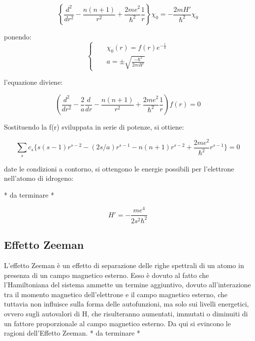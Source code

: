 \documentclass{report}
\begin{document}
\begin{equation}
  \left\{\frac{d^2}{dr^2} -\frac{n(n+1)}{r^2} +\frac{2me^2}{\hbar^2}\frac{1}{r} \right\}\chi_0= -\frac{2mH'}{\hbar^2}\chi_0
\end{equation}

ponendo:
\begin{equation}
  \left\{
  \begin{aligned}
     &  & \chi_0(r)=f(r)e^{-\frac{r}{a}}     \\
     &  & a=\pm \sqrt{\frac{-\hbar^2}{2mH'}}
  \end{aligned}
  \right.
\end{equation}

l'equazione diviene:

\begin{equation}
  \left(\frac{d^2}{dr^2} -\frac{2}{a}\frac{d}{dr} -\frac{n(n+1)}{r^2} +\frac{2me^2}{\hbar^2}\frac{1}{r}\right)f(r)=0
\end{equation}

Sostituendo la f(r) sviluppata in serie di potenze, si ottiene:

\begin{equation}
  \sum_{s} c_s \{s(s-1)r^{s-2}-(2s/a)r^{s-1}-n(n+1)r^{s-2}+\frac{2me^2}{\hbar^2}r^{s-1} \}=0
\end{equation}

date le condizioni a contorno, si ottengono le energie possibili per l'elettrone nell'atomo di idrogeno:

* da terminare *

\begin{equation}
  H'=-\frac{me^4}{2s^2\hbar^2}
\end{equation}

\subsection{Effetto Zeeman}
L'effetto Zeeman è un effetto di separazione delle righe spettrali di un atomo in presenza di un campo magnetico esterno.
Esso è dovuto al fatto che l'Hamiltoniana del sistema ammette un termine aggiuntivo, dovuto all'interazione tra il momento magnetico dell'elettrone e il campo magnetico esterno,
che tuttavia non influisce sulla forma delle autofunzioni, ma solo sui livelli energetici, ovvero sugli autovalori di H,
che risulteranno aumentati, immutati o diminuiti di un fattore proporzionale al campo magnetico esterno.
Da qui si evincono le ragioni dell'Effetto Zeeman.
* da terminare *
\end{document}
